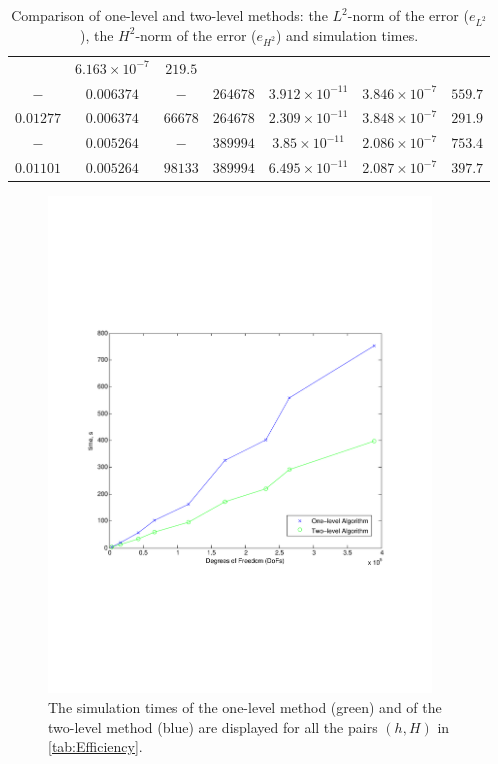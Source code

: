 \begin{table}
\begin{center}
{\begin{tabular}{|c|c|c|c|c|c|c|}
        & $6.163\times 10^{-7}$ & $219.5$ \\
      $-$         & $0.006374$  & $-$       & $264678$  & $3.912\times 10^{-11}$
      & $3.846\times 10^{-7}$ & $559.7$ \\
      $0.01277$   & $0.006374$  & $66678$   & $264678$  & $2.309\times 10^{-11}$
        & $3.848\times 10^{-7}$ & $291.9$\\
      $-$         & $0.005264$  & $-$       & $389994$  & $3.85\times 10^{-11}$
        & $2.086\times 10^{-7}$ & $753.4$ \\
      $0.01101$   & $0.005264$  & $98133$   & $389994$  & $6.495\times 10^{-11}$
        & $2.087\times 10^{-7}$ & $397.7$ \\
      \hline
    \end{tabular}}
  \end{center}
  \caption{Comparison of one-level and two-level methods: the $L^2$-norm of the
    error ($e_{L^2}$), the $H^2$-norm of the error ($e_{H^2}$) and simulation
    times.}
  \label{tab:Efficiency}
\end{table}

\begin{center}
  \begin{figure}
    \begin{center}
    \includegraphics[width=4in,natwidth=610,natheight=642]{performanceplot.pdf}
    \caption{The simulation times of the one-level method (green) and of the
      two-level method (blue) are displayed for all the pairs $(h,H)$ in
      \autoref{tab:Efficiency}.}
    \label{fig:Efficiency}
    \end{center}
  \end{figure}
\end{center}

